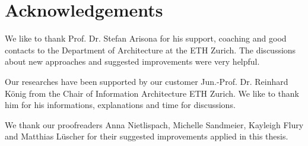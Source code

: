 \section{Acknowledgements}

We like to thank Prof. Dr. Stefan Arisona for his support, coaching and good contacts to the Department of Architecture at the ETH Zurich. The discussions about new approaches and suggested improvements were very helpful.

Our researches have been supported by our customer Jun.-Prof. Dr. Reinhard König from the Chair of Information Architecture ETH Zurich. We like to thank him for his informations, explanations and time for discussions.

We thank our proofreaders Anna Nietlispach, Michelle Sandmeier, Kayleigh Flury and Matthias Lüscher for their suggested improvements applied in this thesis.